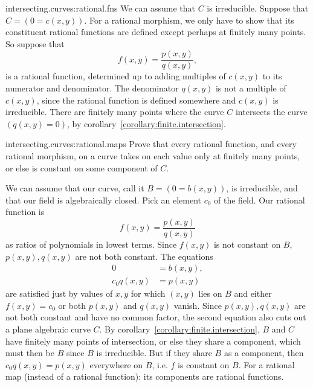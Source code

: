 \begin{answer}{intersecting.curves:rational.fns}
We can assume that \(C\) is irreducible.
Suppose that \(C=(0=c(x,y))\).
For a rational morphism, we only have to show that its constituent rational functions are defined except perhaps at finitely many points.
So suppose that 
\[
f(x,y)=\frac{p(x,y)}{q(x,y)},
\]
is a rational function, determined up to adding multiples of \(c(x,y)\) to its numerator and denominator.
The denominator \(q(x,y)\) is not a multiple of \(c(x,y)\), since the rational function is defined somewhere and \(c(x,y)\) is irreducible.
There are finitely many points where the curve \(C\) intersects the curve \((q(x,y)=0)\), by corollary~\vref{corollary:finite.intersection}.
\end{answer}
\begin{problem}{intersecting.curves:rational.maps}
Prove that every rational function, and every rational morphism, on a curve takes on each value only at finitely many points, or else is constant on some component of \(C\).
\end{problem}
\begin{answer}
We can assume that our curve, call it \(B=(0=b(x,y))\), is irreducible, and that our field is algebraically closed.
Pick an element \(c_0\) of the field.
Our rational function is
\[
f(x,y)=\frac{p(x,y)}{q(x,y)}
\]
as ratios of polynomials in lowest terms.
Since \(f(x,y)\) is not constant on \(B\), \(p(x,y),q(x,y)\) are not both constant.
The equations
\begin{align*}
0&=b(x,y), \\
c_0q(x,y)&=p(x,y)
\end{align*}
are satisfied just by values of \(x,y\) for which \((x,y)\) lies on \(B\) and either \(f(x,y)=c_0\) or both \(p(x,y)\) and \(q(x,y)\) vanish.
Since \(p(x,y),q(x,y)\) are not both constant and have no common factor, the second equation also cuts out a plane algebraic curve \(C\).
By corollary~\vref{corollary:finite.intersection}, \(B\) and \(C\) have finitely many points of intersection, or else they share a component, which must then be \(B\) since \(B\) is irreducible.
But if they share \(B\) as a component, then \(c_0q(x,y)=p(x,y)\) everywhere on \(B\), i.e. \(f\) is constant on \(B\).
For a rational map (instead of a rational function): its components are rational functions.
\end{answer}
